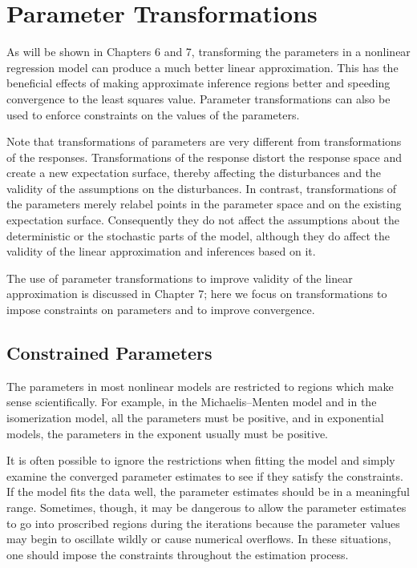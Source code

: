 \section{Parameter Transformations}

As will be shown in Chapters 6 and 7, transforming the parameters in a
nonlinear regression model can produce a much better linear
approximation.  This has the beneficial effects of making approximate
inference regions better and speeding convergence to the least squares
value.  Parameter transformations can also be used to enforce
constraints on the values of the parameters.

Note that transformations of parameters are very different from
transformations of the responses.  Transformations of the response
distort the response space and create a new expectation surface,
thereby affecting the disturbances and the validity of the assumptions
on the disturbances.  In contrast, transformations of the parameters
merely relabel points in the parameter space and on the existing
expectation surface.  Consequently they do not affect the assumptions
about the deterministic or the stochastic parts of the model, although
they do affect the validity of the linear approximation and inferences
based on it.

The use of parameter transformations to improve validity of the linear
approximation is discussed in Chapter 7; here we focus on
transformations to impose constraints on parameters and to improve
convergence.

\subsection{Constrained Parameters}

The parameters in
most nonlinear models are restricted to regions which make sense
scientifically.
For example, in the Michaelis--Menten model
and in the isomerization model, all the parameters must be
positive, and
in exponential models, the parameters in the exponent
usually must be positive.

It is often possible to ignore the restrictions when fitting
the model and simply examine the converged parameter
estimates to see if they satisfy the constraints.
If the model fits the data well, the parameter estimates should
be in a meaningful range.
Sometimes, though, it may be dangerous to allow the
parameter estimates to go into proscribed regions
during the iterations because the parameter values
may begin to oscillate wildly or
cause numerical overflows.
In these situations, one should impose the constraints throughout the
estimation process.

